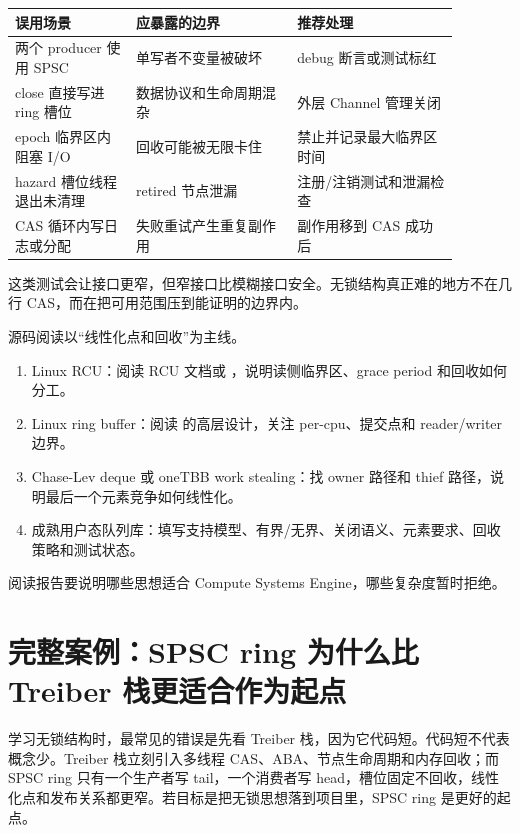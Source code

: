 \begin{center}
\small
\begin{tabular}{@{}p{0.24\linewidth}p{0.32\linewidth}p{0.32\linewidth}@{}}
\toprule
误用场景 & 应暴露的边界 & 推荐处理 \\
\midrule
两个 producer 使用 SPSC & 单写者不变量被破坏 & debug 断言或测试标红 \\
close 直接写进 ring 槽位 & 数据协议和生命周期混杂 & 外层 Channel 管理关闭 \\
epoch 临界区内阻塞 I/O & 回收可能被无限卡住 & 禁止并记录最大临界区时间 \\
hazard 槽位线程退出未清理 & retired 节点泄漏 & 注册/注销测试和泄漏检查 \\
CAS 循环内写日志或分配 & 失败重试产生重复副作用 & 副作用移到 CAS 成功后 \\
\bottomrule
\end{tabular}
\end{center}

这类测试会让接口更窄，但窄接口比模糊接口安全。无锁结构真正难的地方不在几行 CAS，而在把可用范围压到能证明的边界内。

\begin{sourcereadingbox}
源码阅读以“线性化点和回收”为主线。
\begin{enumerate}
  \item Linux RCU：阅读 RCU 文档或 ，说明读侧临界区、grace period 和回收如何分工。
  \item Linux ring buffer：阅读  的高层设计，关注 per-cpu、提交点和 reader/writer 边界。
  \item Chase-Lev deque 或 oneTBB work stealing：找 owner 路径和 thief 路径，说明最后一个元素竞争如何线性化。
  \item 成熟用户态队列库：填写支持模型、有界/无界、关闭语义、元素要求、回收策略和测试状态。
\end{enumerate}
阅读报告要说明哪些思想适合 Compute Systems Engine，哪些复杂度暂时拒绝。
\end{sourcereadingbox}

\section{完整案例：SPSC ring 为什么比 Treiber 栈更适合作为起点}

学习无锁结构时，最常见的错误是先看 Treiber 栈，因为它代码短。代码短不代表概念少。Treiber 栈立刻引入多线程 CAS、ABA、节点生命周期和内存回收；而 SPSC ring 只有一个生产者写 tail，一个消费者写 head，槽位固定不回收，线性化点和发布关系都更窄。若目标是把无锁思想落到项目里，SPSC ring 是更好的起点。

